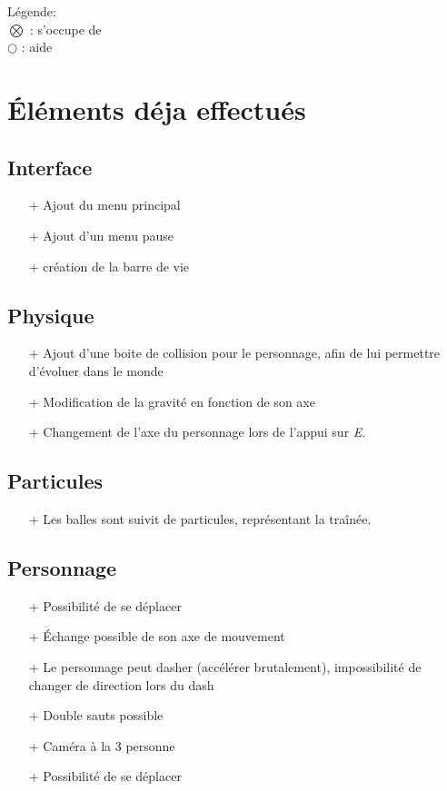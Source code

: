 ﻿\documentclass[12pt]{article}
\begin{document}
Légende:\\
$\bigotimes$ : s'occupe de\\
$\bigcirc$ : aide

\section{Éléments déja effectués}
\subsection{Interface}
\begin{itemize}
\item[+] Ajout du menu principal
\item[+] Ajout d'un menu pause
\item[+] création de la barre de vie
\end{itemize}

\subsection{Physique}
\begin{itemize}
\item[+] Ajout d'une boite de collision pour le personnage, afin de lui permettre d'évoluer dans le monde
\item[+] Modification de la gravité en fonction de son axe
\item[+] Changement de l'axe du personnage lors de l'appui sur \emph{E}.
\end{itemize}

\subsection{Particules}
\begin{itemize}
\item[+] Les balles sont suivit de particules, représentant la traînée.
\end{itemize}

\subsection{Personnage}
\begin{itemize}
\item[+] Possibilité de se déplacer
\item[+] Échange possible de son axe de mouvement
\item[+] Le personnage peut dasher (accélérer brutalement), impossibilité de changer de direction lors du dash
\item[+] Double sauts possible
\item[+] Caméra à la 3\ieme{} personne
\item[+] Possibilité de se déplacer
\end{itemize}
\end{document}

